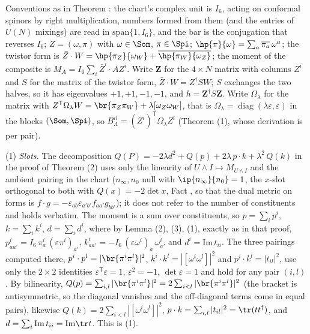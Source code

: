 Conventions as in Theorem : the chart's complex unit is $I_{6}$, acting on conformal spinors by right multiplication, numbers formed from them (and the entries of $U(N)$ mixings) are read in $\mathrm{span}\{1, I_{6}\}$, and the bar is the conjugation that reverses $I_{6}$; $Z = (\omega, \pi)$ with $\omega \in \Som$, $\pi \in \Spi$; $\hp{\pi}{\omega} = \sum_{a}\overline{\pi_{a}}\,\omega^{a}$; the twistor form is $\bar{Z}\cdot W = \hp{\pi_{Z}}{\omega_{W}} + \overline{\hp{\pi_{W}}{\omega_{Z}}}$; the moment of the composite is $M_{A} = I_{6}\sum_{i}\bar{Z}^{i}\cdot AZ^{i}$. Write $\mathbf{Z}$ for the $4\times N$ matrix with columns $Z^{i}$ and $S$ for the matrix of the twistor form, $\bar{Z}\cdot W = Z^{\dagger}SW$; $S$ exchanges the two halves, so it has eigenvalues $+1, +1, -1, -1$, and $h = \mathbf{Z}^{\dagger}S\mathbf{Z}$. Write $\Omega_{\lambda}$ for the matrix with $Z^{\mathsf T}\Omega_{\lambda}W = \br{\pi_{Z}\pi_{W}} + \lambda[\omega_{Z}\omega_{W}]$, that is $\Omega_{\lambda} = \operatorname{diag}(\lambda\varepsilon, \varepsilon)$ in the blocks $(\Som, \Spi)$, so $B^{il}_{\Lambda} = (Z^{i})^{\mathsf T}\Omega_{\lambda}Z^{l}$ (Theorem (1), whose derivation is per pair).

(1) \emph{Slots.} The decomposition $Q(P) = -2\lambda d^{2} + Q(p) + 2\lambda\,p\cdot k + \lambda^{2}\,Q(k)$ in the proof of Theorem (2) uses only the linearity of $U\wedge I \mapsto M_{U\wedge I}$ and the ambient pairing in the chart ($n_{\infty}, n_{0}$ null with $\ip{n_{\infty}}{n_{0}} = 1$, the $x$-slot orthogonal to both with $Q(x) = -2\det x$, Fact , so that the dual metric on forms is $f\cdot g = -\varepsilon_{ab}\varepsilon_{a'b'}f_{aa'}g_{bb'}$); it does not refer to the number of constituents and holds verbatim. The moment is a sum over constituents, so $p = \sum_{i}p^{i}$, $k = \sum_{i}k^{i}$, $d = \sum_{i}d^{i}$, where by Lemma (2), (3), (1), exactly as in that proof, $p^{i}_{aa'} = I_{6}\,\overline{\pi^{i}_{a}}\,(\varepsilon\pi^{i})_{a'}$, $k^{i}_{aa'} = -I_{6}\,(\varepsilon\omega^{i})_{a}\,\overline{\omega^{i}_{a'}}$ and $d^{i} = \mathrm{Im}\,t_{ii}$. The three pairings computed there, $p^{i}\cdot p^{l} = |\br{\pi^{i}\pi^{l}}|^{2}$, $k^{i}\cdot k^{l} = |[\omega^{i}\omega^{l}]|^{2}$ and $p^{i}\cdot k^{l} = |t_{il}|^{2}$, use only the $2\times 2$ identities $\varepsilon^{\mathsf T}\varepsilon = 1$, $\varepsilon^{2} = -1$, $\det\varepsilon = 1$ and hold for any pair $(i, l)$. By bilinearity, $Q(p) = \sum_{i,l}|\br{\pi^{i}\pi^{l}}|^{2} = 2\sum_{i<l}|\br{\pi^{i}\pi^{l}}|^{2}$ (the bracket is antisymmetric, so the diagonal vanishes and the off-diagonal terms come in equal pairs), likewise $Q(k) = 2\sum_{i<l}|[\omega^{i}\omega^{l}]|^{2}$, $p\cdot k = \sum_{i,l}|t_{il}|^{2} = \tr(tt^{\dagger})$, and $d = \sum_{i}\mathrm{Im}\,t_{ii} = \mathrm{Im}\tr t$. This is (1).

